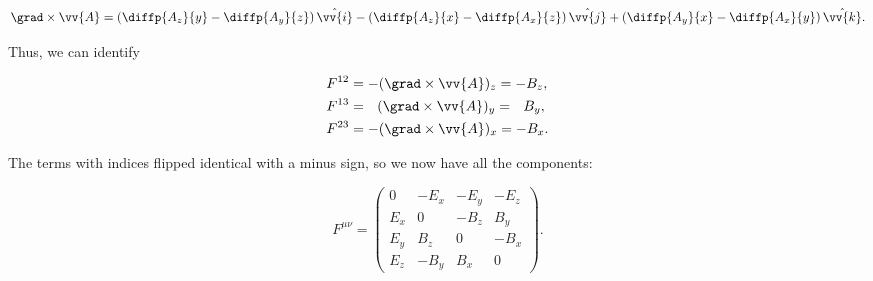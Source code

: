 \newcommand{\ihat}{\hat{\vv{i}}}
\newcommand{\jhat}{\hat{\vv{j}}}
\newcommand{\khat}{\hat{\vv{k}}}
\begin{equation*}
    \grad\times\vv{A} = \left( \diffp{A_z}{y} - \diffp{A_y}{z} \right)\ihat - \left( \diffp{A_z}{x} - \diffp{A_x}{z} \right)\jhat + \left( \diffp{A_y}{x} - \diffp{A_x}{y} \right)\khat.
\end{equation*}

\newcommand{\GRADA}{\grad\times\vv{A}}
Thus, we can identify 

\begin{align*}
    &F^{12} = -(\GRADA)_z = -B_z, \\
    &F^{13} = \ \ (\GRADA)_y =\ \  B_y, \\
    &F^{23} = -(\GRADA)_x = -B_x.
\end{align*}

The terms with indices flipped identical with a minus sign, so we now have all the components:

\begin{equation*}
    \boxed{F^{\mu\nu} = \begin{pmatrix}
        0 & -E_x & -E_y & -E_z \\
        E_x & 0 & -B_z & B_y \\
        E_y & B_z & 0 & -B_x \\
        E_z & -B_y & B_x & 0
    \end{pmatrix}.}
\end{equation*}